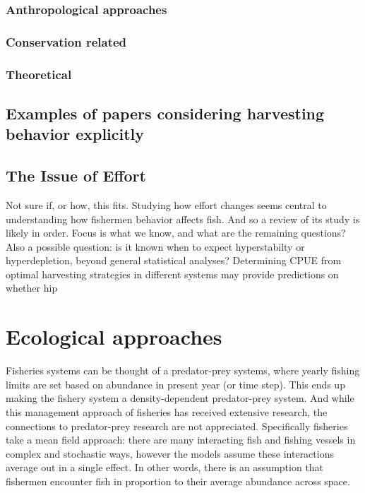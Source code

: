 \documentclass[a4paper,10pt]{report}
\begin{document}
\subsubsection{Anthropological approaches}

\subsubsection{Conservation related}


\subsubsection{Theoretical}


\subsection{Examples of papers considering harvesting behavior explicitly}

\subsection{The Issue of Effort}
Not sure if, or how, this fits. Studying how effort changes seems central to understanding how fishermen behavior affects fish. And so a review of its study is likely in order. Focus is what we know, and what are the remaining questions? Also a possible question: is it known when to expect hyperstabilty or hyperdepletion, beyond general statistical analyses? Determining CPUE from optimal harvesting strategies in different systems may provide predictions on whether hip

\section{Ecological approaches}
Fisheries systems can be thought of a predator-prey systems, where yearly fishing limits are set based on abundance in present year (or time step). This ends up making the fishery system a density-dependent predator-prey system. And while this management approach of fisheries has received extensive research, the connections to predator-prey research are not appreciated. Specifically fisheries take a mean field approach: there are many interacting fish and fishing vessels in complex and stochastic ways, however the models assume these interactions average out in a single effect. In other words, there is an assumption that fishermen encounter fish in proportion to their average abundance across space. 
\end{document}
